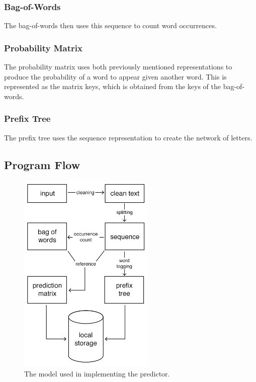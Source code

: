 \documentclass[journal]{./IEEE/IEEEtran}
\begin{document}
\subsubsection{Bag-of-Words}
The bag-of-words then uses this sequence to count word occurrences.

\subsubsection{Probability Matrix}
The probability matrix uses both previously mentioned representations to produce the probability of a word to appear given another word. This is represented as the matrix keys, which is obtained from the keys of the bag-of-words.

\subsubsection{Prefix Tree}
The prefix tree uses the sequence representation to create the network of letters.

\subsection{Program Flow}
\begin{figure}[!ht]
\begin{center}

\includegraphics[width=65mm]{images/model.jpg}
\caption{The model used in implementing the predictor.}

\end{center}
\end{figure}
\end{document}
